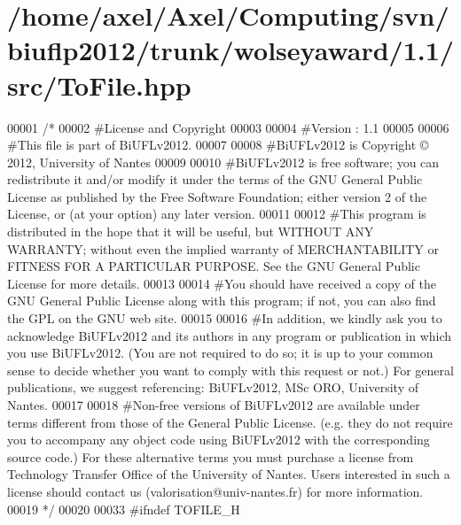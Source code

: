 \hypertarget{ToFile_8hpp_source}{\section{/home/axel/\-Axel/\-Computing/svn/biuflp2012/trunk/wolseyaward/1.1/src/\-To\-File.hpp}
}

\begin{DoxyCode}
00001 \textcolor{comment}{/*}
00002 \textcolor{comment}{ #License and Copyright}
00003 \textcolor{comment}{ }
00004 \textcolor{comment}{ #Version : 1.1}
00005 \textcolor{comment}{ }
00006 \textcolor{comment}{ #This file is part of BiUFLv2012.}
00007 \textcolor{comment}{ }
00008 \textcolor{comment}{ #BiUFLv2012 is Copyright © 2012, University of Nantes}
00009 \textcolor{comment}{ }
00010 \textcolor{comment}{ #BiUFLv2012 is free software; you can redistribute it and/or modify it under
       the terms of the GNU General Public License as published by the Free Software
       Foundation; either version 2 of the License, or (at your option) any later version.}
00011 \textcolor{comment}{ }
00012 \textcolor{comment}{ #This program is distributed in the hope that it will be useful, but WITHOUT
       ANY WARRANTY; without even the implied warranty of MERCHANTABILITY or FITNESS FOR
       A PARTICULAR PURPOSE. See the GNU General Public License for more details.}
00013 \textcolor{comment}{ }
00014 \textcolor{comment}{ #You should have received a copy of the GNU General Public License along with
       this program; if not, you can also find the GPL on the GNU web site.}
00015 \textcolor{comment}{ }
00016 \textcolor{comment}{ #In addition, we kindly ask you to acknowledge BiUFLv2012 and its authors in
       any program or publication in which you use BiUFLv2012. (You are not required to
       do so; it is up to your common sense to decide whether you want to comply with
       this request or not.) For general publications, we suggest referencing: 
       BiUFLv2012, MSc ORO, University of Nantes.}
00017 \textcolor{comment}{ }
00018 \textcolor{comment}{ #Non-free versions of BiUFLv2012 are available under terms different from
       those of the General Public License. (e.g. they do not require you to accompany any
       object code using BiUFLv2012 with the corresponding source code.) For these
       alternative terms you must purchase a license from Technology Transfer Office of the
       University of Nantes. Users interested in such a license should contact us
       (valorisation@univ-nantes.fr) for more information.}
00019 \textcolor{comment}{ */}
00020 
00033 \textcolor{preprocessor}{#ifndef TOFILE\_H}

\end{DoxyCode}
